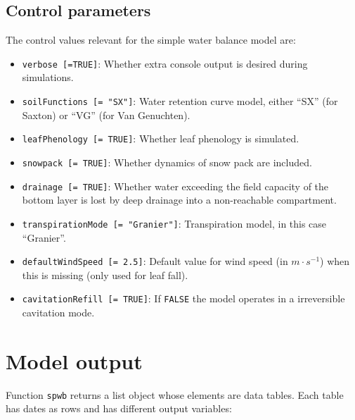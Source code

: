 \documentclass[]{book}
\providecommand{\tightlist}{%
  \setlength{\itemsep}{0pt}\setlength{\parskip}{0pt}}
\begin{document}
\hypertarget{control-parameters-1}{%
\subsection{Control parameters}\label{control-parameters-1}}

The control values relevant for the simple water balance model are:

\begin{itemize}
\tightlist
\item
  \texttt{verbose\ {[}=TRUE{]}}: Whether extra console output is desired during simulations.
\item
  \texttt{soilFunctions\ {[}=\ "SX"{]}}: Water retention curve model, either ``SX'' (for Saxton) or ``VG'' (for Van Genuchten).
\item
  \texttt{leafPhenology\ {[}=\ TRUE{]}}: Whether leaf phenology is simulated.
\item
  \texttt{snowpack\ {[}=\ TRUE{]}}: Whether dynamics of snow pack are included.
\item
  \texttt{drainage\ {[}=\ TRUE{]}}: Whether water exceeding the field capacity of the bottom layer is lost by deep drainage into a non-reachable compartment.
\item
  \texttt{transpirationMode\ {[}=\ "Granier"{]}}: Transpiration model, in this case ``Granier''.
\item
  \texttt{defaultWindSpeed\ {[}=\ 2.5{]}}: Default value for wind speed (in \(m \cdot s^{-1}\)) when this is missing (only used for leaf fall).
\item
  \texttt{cavitationRefill\ {[}=\ TRUE{]}}: If \texttt{FALSE} the model operates in a irreversible cavitation mode.
\end{itemize}

\hypertarget{model-output}{%
\section{Model output}\label{model-output}}

Function \texttt{spwb} returns a list object whose elements are data tables. Each table has dates as rows and has different output variables:
\end{document}
